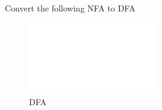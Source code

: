 
\begin{example}
    Convert the following NFA to DFA
\end{example}

\begin{figure}[!h]
    \centering
    \includegraphics[width=0.5\textwidth]{figures/default.png}
    \caption{DFA}
\end{figure}

